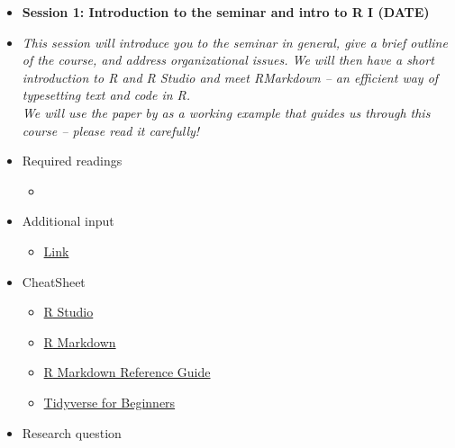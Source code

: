 \documentclass[12pt, a4paper]{article}
\begin{document}
\begin{itemize}
\vspace*{0.04in}
\noindent\rule{16cm}{0.7pt}
\vspace*{-0.45in}
\item[] \textbf{Session 1: Introduction to the seminar and intro to R I (DATE)} 
\item[]\textit{This session will introduce you to the seminar in general, give a brief outline of the course, and address organizational issues. We will then have a short introduction to \textsf{R} and \textsf{R} Studio and meet \textsf{R}Markdown -- an efficient way of typesetting text and code in \textsf{R}.\\
We will use the paper by \textcite{hultman2014beyond} as a working example that guides us through this course -- please read it carefully!}
\item[] \faBook \space Required readings
\begin{itemize} 
\item[$\square$] 
\end{itemize}
{\color{darkgray}}
\item[] \faEdit \space Additional input 
\begin{itemize} 
\item[$\square$] \href{url}{Link}
\end{itemize}
\item[] \faLightbulbO \space CheatSheet
\begin{itemize} 
\item[$\square$] \href{https://github.com/rstudio/cheatsheets/raw/master/rstudio-ide.pdf}{\textsf{R} Studio}
\item[$\square$] \href{https://github.com/rstudio/cheatsheets/raw/master/rmarkdown-2.0.pdf}{\textsf{R} Markdown}
\item[$\square$] \href{http://442r58kc8ke1y38f62ssb208-wpengine.netdna-ssl.com/wp-content/uploads/2015/03/rmarkdown-reference.pdf}{\textsf{R} Markdown Reference Guide}
\item[$\square$] \href{https://bit.ly/31qRe28}{Tidyverse for Beginners}
\end{itemize}
\item[] \faExclamation \space 
\space Research question


\end{itemize}
\end{document}
